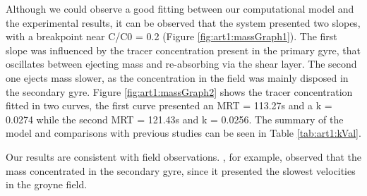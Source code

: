 Although we could observe a good fitting between our computational model and the experimental results, it can be observed that the system presented two slopes, with a breakpoint near C/C0 = 0.2 (Figure \ref{fig:art1:massGraph1}). The first slope was influenced by the tracer concentration present in the primary gyre, that oscillates between ejecting mass and re-absorbing via the shear layer. The second one ejects mass slower, as the concentration in the field was mainly disposed in the secondary gyre. Figure \ref{fig:art1:massGraph2} shows the tracer concentration fitted in two curves, the first curve presented an MRT = 113.27s and a k = 0.0274 while the second MRT = 121.43s and k = 0.0256. The summary of the model and comparisons with previous studies can be seen in Table \ref{tab:art1:kVal}.

Our results are consistent with field observations. \textcite{sukhodolov2014}, for example, observed that the mass concentrated in the secondary gyre, since it presented the slowest velocities in the groyne field.

